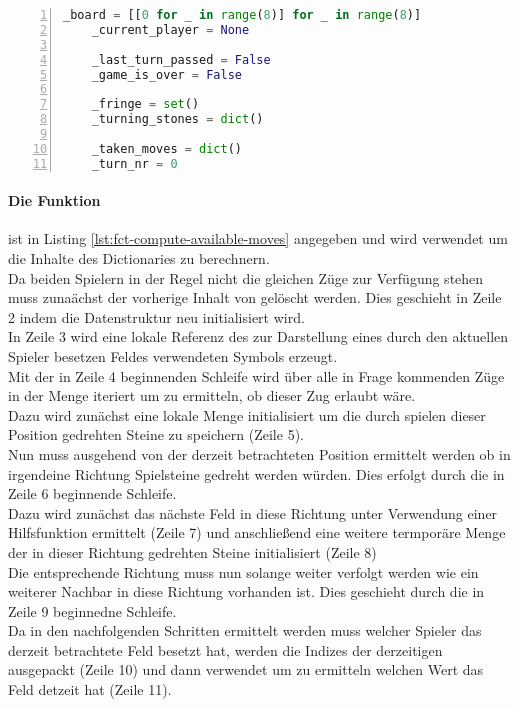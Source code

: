 \begin{lstlisting}[caption = {Klassenvariablen der Klasse \mxZitat{Othello}}, language = python, captionpos = t , numbers=left, label={lst:class-vars-othello}]
    _board = [[0 for _ in range(8)] for _ in range(8)]
    _current_player = None
 
    _last_turn_passed = False
    _game_is_over = False

    _fringe = set()
    _turning_stones = dict()
    
    _taken_moves = dict()
    _turn_nr = 0
\end{lstlisting}
\paragraph{Die Funktion }
 ist in Listing \ref{lst:fct-compute-available-moves} angegeben und wird verwendet um die Inhalte des Dictionaries  zu berechnern.
\\Da beiden Spielern in der Regel nicht die gleichen Züge zur Verfügung stehen muss zunaächst der vorherige Inhalt von  gelöscht werden. Dies geschieht in Zeile 2 indem die Datenstruktur neu initialisiert wird.
\\In Zeile 3 wird eine lokale Referenz des zur Darstellung eines durch den aktuellen Spieler besetzen Feldes verwendeten Symbols erzeugt.
\\Mit der in Zeile 4 beginnenden Schleife wird über alle in Frage kommenden Züge in der Menge  iteriert um zu ermitteln, ob dieser Zug erlaubt wäre.
\\Dazu wird zunächst eine lokale Menge initialisiert um die durch spielen dieser Position gedrehten Steine zu speichern (Zeile 5).
\\Nun muss ausgehend von der derzeit betrachteten Position ermittelt werden ob in irgendeine Richtung Spielsteine gedreht werden würden. Dies erfolgt durch die in Zeile 6 beginnende Schleife.
\\Dazu wird zunächst das nächste Feld in diese Richtung unter Verwendung einer Hilfsfunktion ermittelt (Zeile 7) und anschließend eine weitere termporäre Menge der in dieser Richtung gedrehten Steine initialisiert (Zeile 8)
\\Die entsprechende Richtung muss nun solange weiter verfolgt werden wie ein weiterer Nachbar in diese Richtung vorhanden ist. Dies geschieht durch die in Zeile 9 beginnedne Schleife.
\\Da in den nachfolgenden Schritten ermittelt werden muss welcher Spieler das derzeit betrachtete Feld besetzt hat, werden die Indizes der derzeitigen  ausgepackt (Zeile 10) und dann verwendet um zu ermitteln welchen Wert das Feld detzeit hat (Zeile 11).
